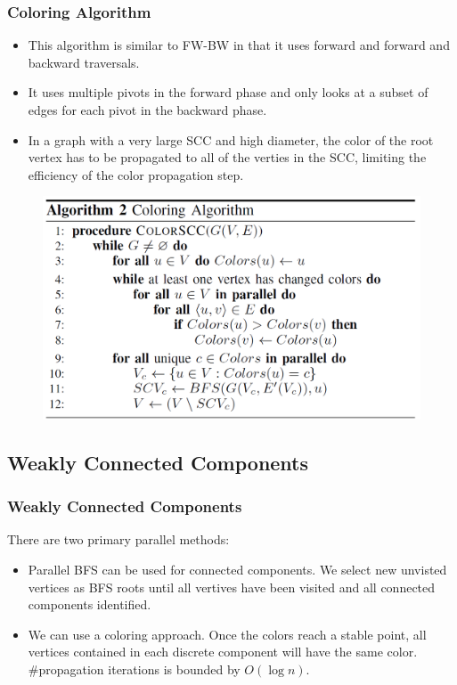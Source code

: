 \begin{frame}
	\frametitle{Coloring Algorithm}
	\begin{itemize}
		\setlength\itemsep{1em}
		\item This algorithm is similar to FW-BW in that it uses forward and 
			forward and backward traversals.
		\item It uses multiple pivots in the forward phase and only looks at a 
			subset of edges for each pivot in the backward phase.
		\item In a graph with a very large SCC and high diameter, the color of
			the root vertex has to be propagated to all of the verties in the
			SCC, limiting the efficiency of the color propagation step.
	\end{itemize}
\end{frame}

\begin{frame}
	\begin{figure}
		\includegraphics[scale=0.30]{figure/fig-Coloring.png}
	\end{figure}
\end{frame}

\subsection{Weakly Connected Components}
\begin{frame}
	\frametitle{Weakly Connected Components}
	There are two primary parallel methods:
	\begin{itemize}
		\setlength\itemsep{1em}
		\item Parallel BFS can be used for connected components. 
			We select new unvisted vertices as BFS roots until all vertives 
			have been visited and all connected components identified.
		\item We can use a coloring approach. Once the colors reach 
			a stable point, all vertices contained in each discrete 
			component will have the same color. \#propagation iterations 
			is bounded by $O(\log n)$.
	\end{itemize}
\end{frame}

